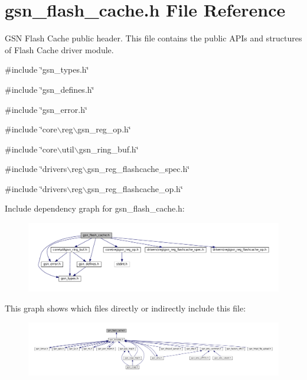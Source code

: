 \hypertarget{a00500}{
\section{gsn\_\-flash\_\-cache.h File Reference}
\label{a00500}
}


GSN Flash Cache public header. This file contains the public APIs and structures of Flash Cache driver module.  


{\ttfamily \#include \char`\"{}gsn\_\-types.h\char`\"{}}\par
{\ttfamily \#include \char`\"{}gsn\_\-defines.h\char`\"{}}\par
{\ttfamily \#include \char`\"{}gsn\_\-error.h\char`\"{}}\par
{\ttfamily \#include \char`\"{}core$\backslash$reg$\backslash$gsn\_\-reg\_\-op.h\char`\"{}}\par
{\ttfamily \#include \char`\"{}core$\backslash$util$\backslash$gsn\_\-ring\_\-buf.h\char`\"{}}\par
{\ttfamily \#include \char`\"{}drivers$\backslash$reg$\backslash$gsn\_\-reg\_\-flashcache\_\-spec.h\char`\"{}}\par
{\ttfamily \#include \char`\"{}drivers$\backslash$reg$\backslash$gsn\_\-reg\_\-flashcache\_\-op.h\char`\"{}}\par
Include dependency graph for gsn\_\-flash\_\-cache.h:
\nopagebreak
\begin{figure}[H]
\begin{center}
\leavevmode
\includegraphics[width=400pt]{a00729}
\end{center}
\end{figure}
This graph shows which files directly or indirectly include this file:
\nopagebreak
\begin{figure}[H]
\begin{center}
\leavevmode
\includegraphics[width=400pt]{a00730}
\end{center}
\end{figure}

